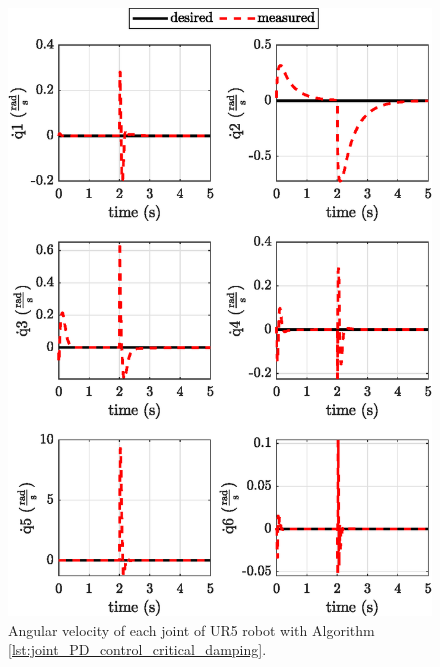 \begin{figure}[H]
    \centering
    \includegraphics{images/act_1.5/joint_velocity.eps}
    \caption{Angular velocity of each joint of UR5 robot with Algorithm \ref{lst:joint_PD_control_critical_damping}.}
    \label{fig:act_1.5_joint_velocity}
\end{figure}

